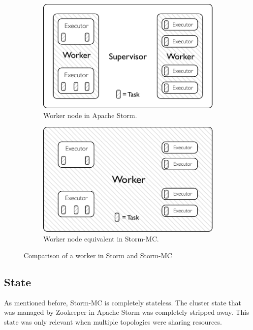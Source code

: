 \documentclass[bsc,logo,frontabs,twoside,singlespacing,normalheadings,parskip]{infthesis}\usepackage[]{graphicx}\usepackage[]{color}
\begin{document}
\begin{figure}[!htb]
\centering
\begin{subfigure}{.5\textwidth}
  \centering
  \includegraphics[width=0.95\linewidth]{pdf/distributed_worker.pdf}
  \caption{Worker node in Apache Storm.}
  \label{fig:comparison1}
\end{subfigure}\begin{subfigure}{.5\textwidth}
  \centering
  \includegraphics[width=0.95\linewidth]{pdf/local_worker.pdf}
  \caption{Worker node equivalent in Storm-MC.}
  \label{fig:comparison2}
\end{subfigure}
\caption{Comparison of a worker in Storm and Storm-MC}
\label{fig:comparison}
\end{figure}

\subsection{State}

As mentioned before, Storm-MC is completely stateless. The cluster state that was managed by Zookeeper in Apache Storm was completely stripped away. This state was only relevant when multiple topologies were sharing resources.
\end{document}
